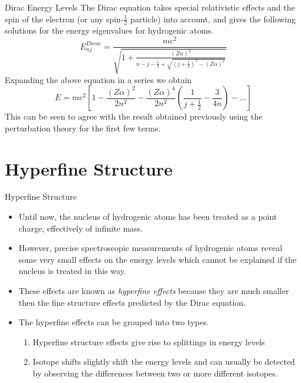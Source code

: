 \documentclass[aspectratio=1610,xcolor=dvipsnames,t]{beamer}
\begin{document}
    \begin{frame}{Dirac Energy Levels} 
    The Dirac equation takes special relativistic effects and the spin of the electron
    (or any spin-$\frac{1}{2}$ particle) into account, and gives the following solutions for the energy
    eigenvalues for hydrogenic atoms.
    \begin{equation}
        E_{nj}^{Dirac} = \frac{mc^2}
        {
            \sqrt
            { 
                1 + \frac{(Z \alpha)^2}
                {
                    n - j - \frac{1}{2} +
                    \sqrt
                    {
                        \left(j + \frac{1}{2}\right)^2 - (Z \alpha)^2
                    }
                }
            }
        }
    \end{equation}
    Expanding the above equation in a series we obtain
    \begin{equation}
        E = mc^2 \left[ 
            1 - \frac{(Z\alpha)^2}{2n^2} - \frac{(Z\alpha)^4}{2n^2}
                    \left(
                        \frac{1}{j + \frac{1}{2}} - \frac{3}{4n}
                    \right)
                        - ...
                 \right]
    \end{equation}
    This can be seen to agree with the result obtained previously using the perturbation
    theory for the first few terms.
    \end{frame} 

\section{Hyperfine Structure}
    \begin{frame}{Hyperfine Structure} 
        \begin{itemize} 
            \item Until now, the nucleus of hydrogenic atoms has been treated
                as a point charge, effectively of infinite mass. 
            \item However, precise spectroscopic measurements of hydrogenic atoms reveal some very small effects on the energy levels which cannot be explained if the nucleus is treated in this way. 
            \item These effects are known as \emph{hyperfine effects} because they are much smaller then the fine
    structure effects predicted by the Dirac equation. 
\item The hyperfine effects can be grouped into two types.
    \begin{enumerate}
        \item Hyperfine structure effects give rise to splittings in energy levels
        \item Isotope shifts slightly shift the energy levels and can usually be 
              detected by observing the differences between two or more 
              different isotopes.
    \end{enumerate} 
    \end{itemize} 
\end{frame} 
\end{document}
